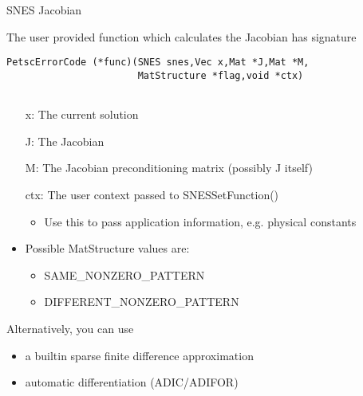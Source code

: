 \begin{frame}[fragile]{SNES Jacobian}

The user provided function which calculates the Jacobian has signature
\begin{center}\small

\begin{verbatim}
PetscErrorCode (*func)(SNES snes,Vec x,Mat *J,Mat *M,
                       MatStructure *flag,void *ctx)
                     
\end{verbatim}

\end{center}
\begin{itemize}
  \item[{\kb x}:] The current solution
  \item[{\kb J}:] The Jacobian
  \item[{\kb M}:] The Jacobian preconditioning matrix (possibly J itself)
  \item[{\kb ctx}:] The user context passed to {\kb SNESSetFunction()}
  \begin{itemize}
    \item Use this to pass application information, e.g. physical constants
  \end{itemize}

  \item Possible {\kb MatStructure} values are:
  \begin{itemize}
    \item SAME\_NONZERO\_PATTERN
    \item DIFFERENT\_NONZERO\_PATTERN
  \end{itemize}
\end{itemize}

Alternatively, you can use
\begin{itemize}
  \item a builtin sparse finite difference approximation
  \item automatic differentiation (ADIC/ADIFOR)
\end{itemize}

\end{frame}
